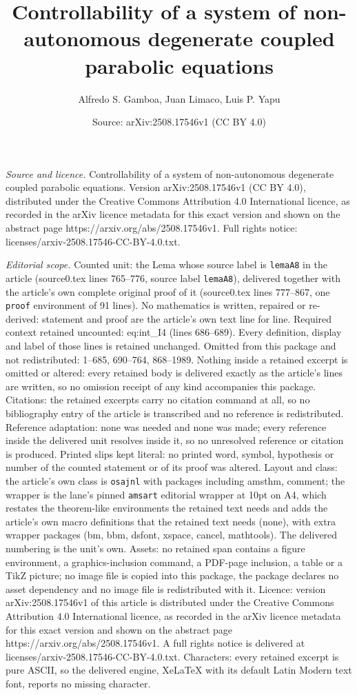 \documentclass[10pt,a4paper]{amsart}
\title[Controllability of a system of non-autonomous degenerate cou]{Controllability of a system of non-autonomous degenerate coupled parabolic equations}
\author{Alfredo S. Gamboa, Juan Limaco, Luis P. Yapu}
\date{Source: arXiv:2508.17546v1 (CC BY 4.0)}
\begin{document}
\maketitle

\noindent\emph{Source and licence.} Controllability of a system of non-autonomous degenerate coupled parabolic equations. Version arXiv:2508.17546v1 (CC BY 4.0), distributed under the Creative Commons Attribution 4.0 International licence, as recorded in the arXiv licence metadata for this exact version and shown on the abstract page https://arxiv.org/abs/2508.17546v1. Full rights notice: licenses/arxiv-2508.17546-CC-BY-4.0.txt.\par\smallskip

\noindent\textit{Editorial scope.} Counted unit: the Lema whose source label is \texttt{lemaA8} in the article (source0.tex lines 765--776, source label \texttt{lemaA8}), delivered together with the article's own complete original proof of it (source0.tex lines 777--867, one \texttt{proof} environment of 91 lines). No mathematics is written, repaired or re-derived: statement and proof are the article's own text line for line. Required context retained uncounted: eq:int\_I4 (lines 686--689). Every definition, display and label of those lines is retained unchanged. Omitted from this package and not redistributed: 1--685, 690--764, 868--1989. Nothing inside a retained excerpt is omitted or altered: every retained body is delivered exactly as the article's lines are written, so no omission receipt of any kind accompanies this package. Citations: the retained excerpts carry no citation command at all, so no bibliography entry of the article is transcribed and no reference is redistributed. Reference adaptation: none was needed and none was made; every reference inside the delivered unit resolves inside it, so no unresolved reference or citation is produced. Printed slips kept literal: no printed word, symbol, hypothesis or number of the counted statement or of its proof was altered. Layout and class: the article's own class is \texttt{osajnl} with packages including amsthm, comment; the wrapper is the lane's pinned \texttt{amsart} editorial wrapper at 10pt on A4, which restates the theorem-like environments the retained text needs and adds the article's own macro definitions that the retained text needs (none), with extra wrapper packages (bm, bbm, dsfont, xspace, cancel, mathtools). The delivered numbering is the unit's own. Assets: no retained span contains a figure environment, a graphics-inclusion command, a PDF-page inclusion, a table or a TikZ picture; no image file is copied into this package, the package declares no asset dependency and no image file is redistributed with it. Licence: version arXiv:2508.17546v1 of this article is distributed under the Creative Commons Attribution 4.0 International licence, as recorded in the arXiv licence metadata for this exact version and shown on the abstract page https://arxiv.org/abs/2508.17546v1. A full rights notice is delivered at licenses/arxiv-2508.17546-CC-BY-4.0.txt. Characters: every retained excerpt is pure ASCII, so the delivered engine, XeLaTeX with its default Latin Modern text font, reports no missing character.
\end{document}
